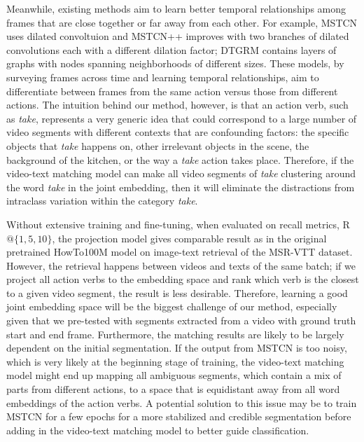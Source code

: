 Meanwhile, existing methods aim to learn better temporal relationships among frames that are close together or far away from each other. For example, MSTCN uses dilated convoltuion and MSTCN++ improves with two branches of dilated convolutions each with a different dilation factor; DTGRM contains layers of graphs with nodes spanning neighborhoods of different sizes. These models, by surveying frames across time and learning temporal relationships, aim to differentiate between frames from the same action versus those from different actions. The intuition behind our method, however, is that an action verb, such as \textit{take}, represents a very generic idea that could correspond to a large number of video segments with different contexts that are confounding factors: the specific objects that \textit{take} happens on, other irrelevant objects in the scene, the background of the kitchen, or the way a \textit{take} action takes place. Therefore, if the video-text matching model can make all video segments of \textit{take} clustering around the word \textit{take} in the joint embedding, then it will eliminate the distractions from intraclass variation within the category \textit{take}.

Without extensive training and fine-tuning, when evaluated on recall metrics, R$@\{1,5,10\}$, the projection model gives comparable result as in the original pretrained HowTo100M model on image-text retrieval of the MSR-VTT dataset. However, the retrieval happens between videos and texts of the same batch; if we project all action verbs to the embedding space and rank which verb is the closest to a given video segment, the result is less desirable. Therefore, learning a good joint embedding space will be the biggest challenge of our method, especially given that we pre-tested with segments extracted from a video with ground truth start and end frame. Furthermore, the matching results are likely to be largely dependent on the initial segmentation. If the output from MSTCN is too noisy, which is very likely at the beginning stage of training, the video-text matching model might end up mapping all ambiguous segments, which contain a mix of parts from different actions, to a space that is equidistant away from all word embeddings of the action verbs. A potential solution to this issue may be to train MSTCN for a few epochs for a more stabilized and credible segmentation before adding in the video-text matching model to better guide classification.

